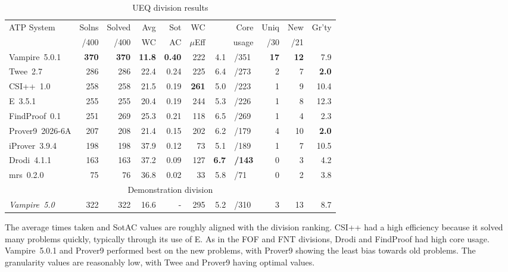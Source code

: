 \documentclass[aic]{iosart2x}
\newcommand{\bb}[1]{\bf {#1}}
\begin{document}
\begin{table}[tbh]
\caption{UEQ division results}
\label{UEQSummary}
\begin{tabular}{lrrrrrr@{}l@{}rrr}
\hline
ATP System             & Solns & Solved & Avg  & Sot & WC       & \multicolumn{2}{r}{Core} &Uniq & New & Gr'ty \\
                       & /400  & /400   & WC   & AC  & $\mu$Eff & \multicolumn{2}{r}{usage}& /30 & /21 &       \\
\hline
Vampire~5.0.1          &  \bb{370}  &  \bb{370}   & \bb{11.8} & \bb{0.40} & 222     & 4.1       & {\tiny /351} &  \bb{17} &  \bb{12} &  7.9  \\
Twee~2.7               &  286  &  286   & 22.4 & 0.24 & 225     & 6.4       & {\tiny /273} &   2 &   7 &  \bb{2.0}  \\
CSI++~1.0              &  258  &  258   & 21.5 & 0.19 & \bb{261}     & 5.0       & {\tiny /223} &   1 &   9 & 10.4  \\
E~3.5.1                &  255  &  255   & 20.4 & 0.19 & 244     & 5.3       & {\tiny /226} &   1 &   8 & 12.3  \\
FindProof~0.1          &  251  &  269   & 25.3 & 0.21 & 118     & 6.5       & {\tiny /269} &   1 &   4 &  2.3  \\
Prover9~2026-6A        &  207  &  208   & 21.4 & 0.15 & 202     & 6.2       & {\tiny /179} &   4 &  10 &  \bb{2.0}  \\
iProver~3.9.4          &  198  &  198   & 37.9 & 0.12 &  73     & 5.1       & {\tiny /189} &   1 &   7 & 10.5  \\
Drodi~4.1.1            &  163  &  163   & 37.2 & 0.09 & 127     & \bb{6.7}       & {\tiny \bb{/143}} &   0 &   3 &  4.2  \\
mrs~0.2.0              &   75  &   76   & 36.8 & 0.02 &  33     & 5.8       & {\tiny /71 } &   0 &   2 &  3.8  \\
\hline
\multicolumn{11}{c}{Demonstration division} \\
\hline
\textit{Vampire~5.0}   &  322  &  322   & 16.6 &    - & 295     & 5.2       & {\tiny /310} &   3 &  13 &  8.7  \\
\hline
\end{tabular}
\end{table}

The average times taken and SotAC values are roughly aligned with the division ranking.
CSI++ had a high efficiency because it solved many problems quickly, typically through its
use of E.
As in the FOF and FNT divisions, Drodi and FindProof had high core usage.
Vampire~5.0.1 and Prover9 performed best on the new problems, with Prover9 showing the least
bias towards old problems.
The granularity values are reasonably low, with Twee and Prover9 having optimal values.
\end{document}
